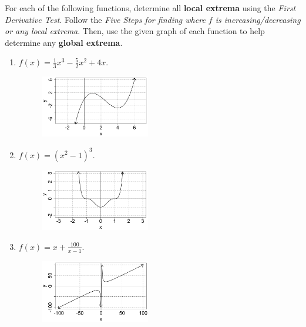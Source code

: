 \begin{example}\label{1stDervTest}
For each of the following functions, determine all \textbf{local extrema} using the \emph{First Derivative Test}. Follow the \emph{Five Steps for finding where $f$ is increasing/decreasing or any local extrema}. Then, use the given graph of each function to help determine any \textbf{global extrema}.
\renewcommand{\labelenumi}{(\alph{enumi})}
\begin{enumerate}[leftmargin=*]
    \item $f(x)=\displaystyle\frac{1}{3}x^3-\frac{5}{2}x^2+4x$. %
    \begin{figure}[h!]
        \includegraphics[width=0.45\textwidth,inner]{images/optimization/exampleGraph2.png}
        \label{fig:exampleGraph2}
    \end{figure}
    \newpage
    \item $f(x)=(x^2-1)^3$. %
    \begin{figure}[h!]
        \includegraphics[width=0.45\textwidth,inner]{images/optimization/exampleGraph3.png}
        \label{fig:exampleGraph3}
    \end{figure}
     \vspace{1in}
    \item $f(x)=x+\displaystyle\frac{100}{x-1}$.  %
    \begin{figure}[h!]
        \includegraphics[width=0.45\textwidth,inner]{images/optimization/exampleGraph4.png}

\end{figure}
\end{enumerate}
\end{example}
